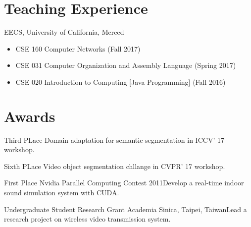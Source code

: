 \documentclass[11pt,letterpaper,sans]{moderncv} %
\begin{document}

\section{Teaching Experience}

%
{EECS, University of California, Merced}
{}{}{}
{
\begin{itemize}
	\item CSE 160 Computer Networks (Fall 2017)
	\item CSE 031 Computer Organization and Assembly Language (Spring 2017)
	\item CSE 020 Introduction to Computing [Java Programming] (Fall 2016)
\end{itemize}
}


\section{Awards}

{Third PLace}{}
{}{}{Domain adaptation for semantic segmentation in ICCV' 17 workshop.}

{Sixth PLace}{}
{}{}{Video object segmentation chllange in CVPR' 17 workshop. }

{First Place}{}
{Nvidia Parallel Computing Contest 2011}{}{Develop a real-time indoor sound simulation system with CUDA.}

{Undergraduate Student Research Grant}{}
{Academia Sinica, Taipei, Taiwan}{}{Lead a research project on wireless video transmission system.}
\end{document}
